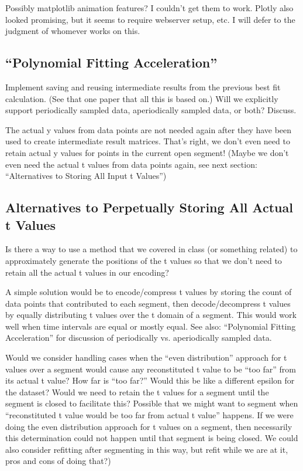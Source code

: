 \documentclass{article}
\begin{document}
Possibly matplotlib animation features? I couldn’t get them to work. Plotly also looked promising, but it seems to require webserver setup, etc.
I will defer to the judgment of whomever works on this.

\subsection{“Polynomial Fitting Acceleration”}
Implement saving and reusing intermediate results from the previous best fit calculation. (See that one paper that all this is based on.)
Will we explicitly support periodically sampled data, aperiodically sampled data, or both? Discuss.

The actual y values from data points are not needed again after they have been used to create intermediate result matrices. That’s right, we don’t even need to retain actual y values for points in the current open segment!
(Maybe we don’t even need the actual t values from data points again, see next section: “Alternatives to Storing All Input t Values”)

\subsection{Alternatives to Perpetually Storing All Actual t Values}
\label{subsec:alternatives_to_storing_t_values}
Is there a way to use a method that we covered in class (or something related) to approximately generate the positions of the t values so that we don’t need to retain all the actual t values in our encoding?

A simple solution would be to encode/compress t values by storing the count of data points that contributed to each segment, then decode/decompress t values by equally distributing t values over the t domain of a segment. This would work well when time intervals are equal or mostly equal. See also: “Polynomial Fitting Acceleration” for discussion of periodically vs. aperiodically sampled data.

Would we consider handling cases when the “even distribution” approach for t values over a segment would cause any reconstituted t value to be “too far” from its actual t value? How far is “too far?” Would this be like a different epsilon for the dataset? Would we need to retain the t values for a segment until the segment is closed to facilitate this?
Possible that we might want to segment when “reconstituted t value would be too far from actual t value” happens. If we were doing the even distribution approach for t values on a segment, then necessarily this determination could not happen until that segment is being closed. We could also consider refitting after segmenting in this way, but refit while we are at it, pros and cons of doing that?)
\end{document}
